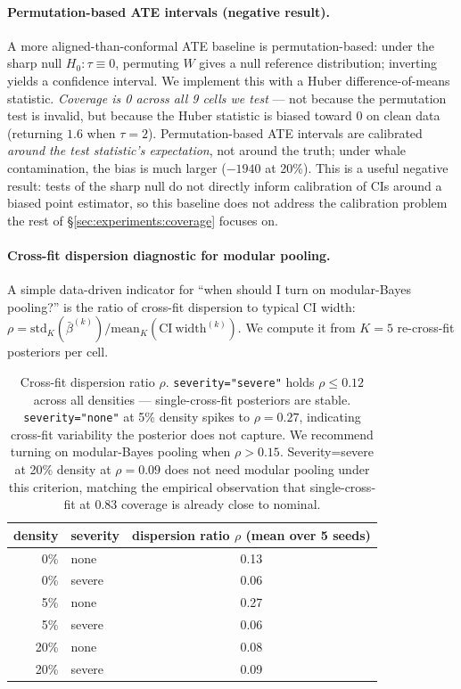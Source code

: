 \paragraph{Permutation-based ATE intervals (negative result).}
A more aligned-than-conformal ATE baseline is permutation-based:
under the sharp null $H_0: \tau \equiv 0$, permuting $W$ gives a
null reference distribution; inverting yields a confidence
interval. We implement this with a Huber difference-of-means
statistic. \emph{Coverage is 0 across all 9 cells we test} ---
not because the permutation test is invalid, but because the
Huber statistic is biased toward 0 on clean data (returning $1.6$
when $\tau = 2$). Permutation-based ATE intervals are calibrated
\emph{around the test statistic's expectation}, not around the
truth; under whale contamination, the bias is much larger
($-1940$ at 20\%). This is a useful negative result: tests of the
sharp null do not directly inform calibration of CIs around a
biased point estimator, so this baseline does not address the
calibration problem the rest of \S\ref{sec:experiments:coverage}
focuses on.

\paragraph{Cross-fit dispersion diagnostic for modular pooling.}
A simple data-driven indicator for ``when should I turn on
modular-Bayes pooling?'' is the ratio of cross-fit dispersion to
typical CI width: $\rho = \mathrm{std}_K(\bar\beta^{(k)}) /
\mathrm{mean}_K(\mathrm{CI~width}^{(k)})$. We compute it from $K = 5$
re-cross-fit posteriors per cell.

\begin{table}[!t]
\centering
\small
\begin{tabular}{rlc}
\toprule
density & severity & dispersion ratio $\rho$ (mean over 5 seeds) \\
\midrule
0\%   & none   & 0.13 \\
0\%   & severe & 0.06 \\
5\%   & none   & 0.27 \\
5\%   & severe & 0.06 \\
20\%  & none   & 0.08 \\
20\%  & severe & 0.09 \\
\bottomrule
\end{tabular}
\caption{Cross-fit dispersion ratio $\rho$. \texttt{severity="severe"}
holds $\rho \le 0.12$ across all densities --- single-cross-fit
posteriors are stable. \texttt{severity="none"} at 5\% density
spikes to $\rho = 0.27$, indicating cross-fit variability the
posterior does not capture. We recommend turning on modular-Bayes
pooling when $\rho > 0.15$. Severity=severe at 20\% density at
$\rho = 0.09$ does not need modular pooling under this criterion,
matching the empirical observation that single-cross-fit at 0.83
coverage is already close to nominal.}
\label{tab:dispersion}
\end{table}


